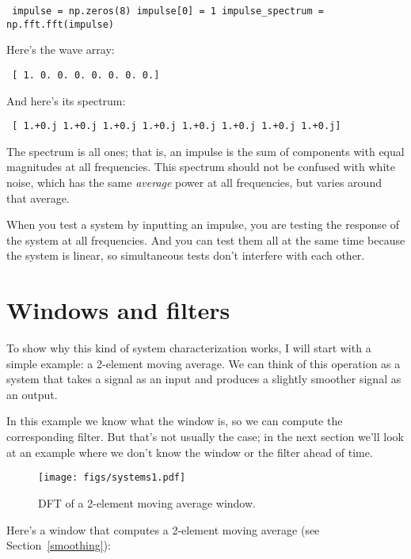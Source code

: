 \documentclass[12pt]{book} \usepackage[width=5.5in,height=8.5in, hmarginratio=3:2,vmarginratio=1:1]{geometry}
\begin{document}
\begin{verbatim} impulse = np.zeros(8) impulse[0] = 1 impulse_spectrum = np.fft.fft(impulse) \end{verbatim} 

Here's the wave array: 

\begin{verbatim} [ 1. 0. 0. 0. 0. 0. 0. 0.] \end{verbatim} 

And here's its spectrum: 

\begin{verbatim} [ 1.+0.j 1.+0.j 1.+0.j 1.+0.j 1.+0.j 1.+0.j 1.+0.j 1.+0.j] \end{verbatim} 

The spectrum is all ones; that is, an impulse is the sum of components with equal magnitudes at all frequencies. This spectrum should not be confused with white noise, which has the same {\em average} power at all frequencies, but varies around that average. 

When you test a system by inputting an impulse, you are testing the response of the system at all frequencies. And you can test them all at the same time because the system is linear, so simultaneous tests don't interfere with each other. 

\section{Windows and filters} \label{winfilt} 

To show why this kind of system characterization works, I will start with a simple example: a 2-element moving average. We can think of this operation as a system that takes a signal as an input and produces a slightly smoother signal as an output. 

In this example we know what the window is, so we can compute the corresponding filter. But that's not usually the case; in the next section we'll look at an example where we don't know the window or the filter ahead of time. 

\begin{figure} 

\centerline{\texttt{[image: figs/systems1.pdf]}} \caption{DFT of a 2-element moving average window.} \label{fig.systems1} \end{figure} 

Here's a window that computes a 2-element moving average (see Section~\ref{smoothing}): 
\end{document}
